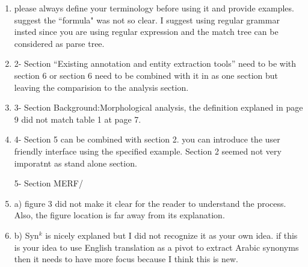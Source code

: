 \begin{enumerate}[leftmargin=0mm,label=\bfseries CommentR3.\arabic*]
\item \label{Review.3.8}
please always define your terminology before using it and 
provide examples. suggest the ``formula" was not so clear. 
I suggest using regular grammar insted since you are using 
regular expression and the match tree can be considered as 
parse tree.

\item \label{Review.3.9}
2- Section ``Existing annotation and entity extraction tools” 
need to be with section 6 or section 6 need to be combined 
with it in as one section but leaving the comparision to 
the analysis section.


\item \label{Review.3.10}
3- Section Background:Morphological analysis, 
the definition explaned in page 9 did not match table 1 at page 7.


\item \label{Review.3.11}
4- Section 5 can be combined with section 2. 
you can introduce the user friendly interface using the 
specified example. 
Section 2 seemed not very imporatnt as stand alone section.

5- Section MERF/


\item \label{Review.3.12}
a) figure 3 did not make it clear for the reader to 
understand the process. Also, the figure location is far 
away from its explanation.



\item \label{Review.3.13}
b) Syn$^k$ is nicely explaned but I did not recognize it as 
your own idea. if this is your idea to use English translation 
as a pivot to extract Arabic synonyms then it needs to have 
more focus because I think this is new.


\end{enumerate}
